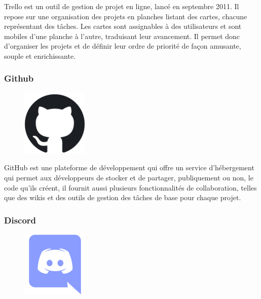 Trello est un outil de gestion de projet en ligne, lancé en septembre 2011. Il 
repose sur une organisation des projets en planches listant des cartes, chacune 
représentant des tâches. Les cartes sont assignables à des utilisateurs et sont 
mobiles d’une planche à l’autre, traduisant leur avancement. Il permet donc 
d’organiser les projets et de définir leur ordre de priorité de façon amusante, 
souple et enrichissante\cite{38}.

\subsubsection*{Github}
    \begin{figure}
        \vspace{-22pt}
        \begin{center}
            \includegraphics[scale=0.36]{images/logo/github.png}
            \label{fig64}
        \end{center}
        \vspace{-20pt}
        \vspace{-10pt}
    \end{figure}

GitHub est une plateforme de développement qui offre un service d’hébergement 
qui permet aux développeurs de stocker et de partager, publiquement ou non, 
le code qu’ils créent, il fournit aussi plusieurs fonctionnalités de 
collaboration, telles que des wikis et des outils de gestion des tâches de base 
pour chaque projet\cite{40}.
        
\subsubsection*{Discord}
    \begin{figure}
        \vspace{-22pt}
        \begin{center}
            \includegraphics[scale=0.36]{images/logo/discord.png}
            \label{fig65}
        \end{center}
            \vspace{-20pt}
            \vspace{-10pt}
    \end{figure}

